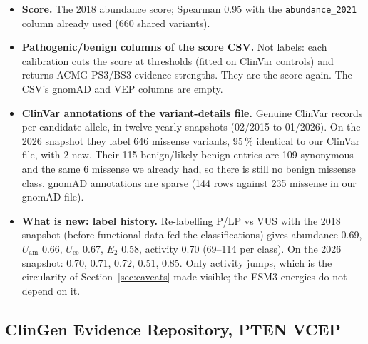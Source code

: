 \documentclass[11pt,a4paper]{article}
\newcommand{\Uam}{U_{\mathrm{am}}}
\newcommand{\Uce}{U_{\mathrm{ce}}}
\newcommand{\Etwo}{E_{2}}
\begin{document}
\begin{itemize}
\item \textbf{Score.} The 2018 abundance score; Spearman 0.95 with the
  \texttt{abundance\_2021} column already used (660 shared variants).
\item \textbf{Pathogenic/benign columns of the score CSV.} Not labels: each
  calibration cuts the score at thresholds (fitted on ClinVar controls) and
  returns ACMG PS3/BS3 evidence strengths. They are the score again. The CSV's
  gnomAD and VEP columns are empty.
\item \textbf{ClinVar annotations of the variant-details file.} Genuine
  ClinVar records per candidate allele, in twelve yearly snapshots
  (02/2015 to 01/2026). On the 2026 snapshot they label 646 missense
  variants, 95\,\% identical to our ClinVar file, with 2 new. Their 115
  benign/likely-benign entries are 109 synonymous and the same 6 missense we
  already had, so there is still no benign missense class. gnomAD annotations
  are sparse (144 rows against 235 missense in our gnomAD file).
\item \textbf{What is new: label history.} Re-labelling P/LP vs VUS with the
  2018 snapshot (before functional data fed the classifications) gives
  abundance 0.69, $\Uam$ 0.66, $\Uce$ 0.67, $\Etwo$ 0.58, activity 0.70
  (69--114 per class). On the 2026 snapshot: 0.70, 0.71, 0.72, 0.51, 0.85.
  Only activity jumps, which is the circularity of Section~\ref{sec:caveats}
  made visible; the ESM3 energies do not depend on it.
\end{itemize}

\subsection{ClinGen Evidence Repository, PTEN VCEP}
\end{document}
